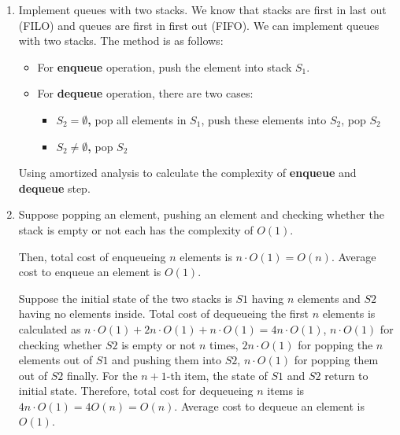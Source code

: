 \documentclass[12pt,a4paper]{article}
\makeatletter
\newtheorem*{solution}{Solution}
\theoremstyle{definition}
\renewenvironment{solution}[1][Solution] {\par\pushQED{\qed}\normalfont\topsep6\p@\@plus6\p@\relax\trivlist\item[\hskip\labelsep\bfseries#1\@addpunct{.}]\ignorespaces}{\popQED\endtrivlist\@endpefalse} \makeatother
\makeatother
\begin{document}
\begin{enumerate}
\item Implement queues with two stacks. We know that stacks are first in last out (FILO) and queues are first in first out (FIFO). We can implement queues with two stacks. The method is as follows:
	\begin{itemize}
		\item{For \textbf{enqueue} operation,} push the element into stack $S_1$.
		\item{For \textbf{dequeue} operation,} there are two cases:
		\begin{itemize}
			\item \textbf{$S_2 = \emptyset$,} pop all elements in $S_1$, push these elements into $S_2$, pop $S_2$
			\item \textbf{$S_2 \neq \emptyset$,} pop $S_2$
		\end{itemize}
	\end{itemize}
	Using amortized analysis to calculate the complexity of \textbf{enqueue} and \textbf{dequeue} step.
\begin{solution}
\noindent
\par
Suppose popping an element, pushing an element and checking whether the stack is empty or not each has the complexity of $O(1)$.
\par
Then, total cost of enqueueing $n$ elements is $n\cdot O(1)=O(n)$. Average cost to enqueue an element is $O(1)$.
\par
Suppose the initial state of the two stacks is $S1$ having $n$ elements and $S2$ having no elements inside. Total cost of dequeueing the first $n$ elements is calculated as $n\cdot O(1)+2n\cdot O(1)+n\cdot O(1)=4n\cdot O(1)$, $n\cdot O(1)$ for checking whether $S2$ is empty or not $n$ times, $2n\cdot O(1)$ for popping the $n$ elements out of $S1$ and pushing them into $S2$, $n\cdot O(1)$ for popping them out of $S2$ finally. For the $n+1$-th item, the state of $S1$ and $S2$ return to initial state. Therefore, total cost for dequeueing $n$ items is $4n\cdot O(1)=4O(n)=O(n)$. Average cost to dequeue an element is $O(1)$.
\end{solution}


\end{enumerate}

\end{document}
